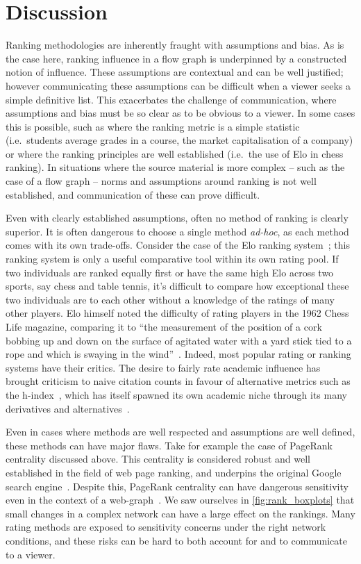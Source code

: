 \section{Discussion}

Ranking methodologies are inherently fraught with assumptions and bias. As is the case here, ranking influence in a flow graph is underpinned by a constructed notion of influence. These assumptions are contextual and can be well justified; however communicating these assumptions can be difficult when a viewer seeks a simple definitive list. This exacerbates the challenge of communication, where assumptions and bias must be so clear as to be obvious to a viewer. In some cases this is possible, such as where the ranking metric is a simple statistic (i.e.\ students average grades in a course, the market capitalisation of a company) or where the ranking principles are well established (i.e.\ the use of Elo in chess ranking). In situations where the source material is more complex -- such as the case of a flow graph -- norms and assumptions around ranking is not well established, and communication of these can prove difficult.

Even with clearly established assumptions, often no method of ranking is clearly superior. It is often dangerous to choose a single method \emph{ad-hoc}, as each method comes with its own trade-offs. Consider the case of the Elo ranking system~\cite{elo_rating_1978}; this ranking system is only a useful comparative tool within its own rating pool. If two individuals are ranked equally first or have the same high Elo across two sports, say chess and table tennis, it's difficult to compare how exceptional these two individuals are to each other without a knowledge of the ratings of many other players. Elo himself noted the difficulty of rating players in the 1962 Chess Life magazine, comparing it to ``the measurement of the position of a cork bobbing up and down on the surface of agitated water with a yard stick tied to a rope and which is swaying in the wind''~\cite{eloUSCFRatingFormulae1962}. Indeed, most popular rating or ranking systems have their critics. The desire to fairly rate academic influence has brought criticism to naive citation counts in favour of alternative metrics such as the h-index~\cite{hirsch_index_2005}, which has itself spawned its own academic niche through its many derivatives and alternatives~\cite{alonso_h-index_2009}. 

Even in cases where methods are well respected and assumptions are well defined, these methods can have major flaws. Take for example the case of PageRank centrality discussed above. This centrality is considered robust and well established in the field of web page ranking, and underpins the original Google search engine~\cite{brin_anatomy_1998}. Despite this, PageRank centrality can have dangerous sensitivity even in the context of a web-graph~\cite{ng_link_2001}. We saw ourselves in \autoref{fig:rank_boxplots} that small changes in a complex network can have a large effect on the rankings. Many rating methods are exposed to sensitivity concerns under the right network conditions, and these risks can be hard to both account for and to communicate to a viewer.

